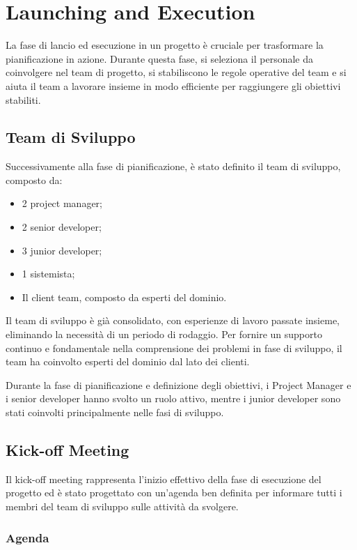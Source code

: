 \section{Launching and Execution}

La fase di lancio ed esecuzione in un progetto è cruciale per trasformare la pianificazione in azione. Durante questa fase, si seleziona il personale da coinvolgere nel team di progetto, si stabiliscono le regole operative del team e si aiuta il team a lavorare insieme in modo efficiente per raggiungere gli obiettivi stabiliti.

\subsection{Team di Sviluppo}

Successivamente alla fase di pianificazione, è stato definito il team di sviluppo, composto da:

\begin{itemize}
    \item 2 project manager;
    \item 2 senior developer;
    \item 3 junior developer;
    \item 1 sistemista;
    \item Il client team, composto da esperti del dominio.
\end{itemize}

Il team di sviluppo è già consolidato, con esperienze di lavoro passate insieme, eliminando la necessità di un periodo di rodaggio. Per fornire un supporto continuo e fondamentale nella comprensione dei problemi in fase di sviluppo, il team ha coinvolto esperti del dominio dal lato dei clienti.

Durante la fase di pianificazione e definizione degli obiettivi, i Project Manager e i senior developer hanno svolto un ruolo attivo, mentre i junior developer sono stati coinvolti principalmente nelle fasi di sviluppo.

\subsection{Kick-off Meeting}

Il kick-off meeting rappresenta l'inizio effettivo della fase di esecuzione del progetto ed è stato progettato con un'agenda ben definita per informare tutti i membri del team di sviluppo sulle attività da svolgere.

\subsubsection{Agenda}

